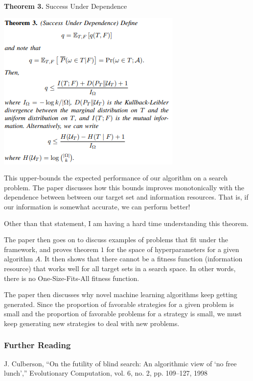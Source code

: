 \documentclass{article}
\begin{document}
\bigskip

\newpage
\textbf{Theorem 3.} Success Under Dependence
\begin{center}
    \includegraphics{SuccessUnderDependence.PNG}
\end{center}

This upper-bounds the expected performance of our algorithm on a search problem. The paper discusses how this bounds improves monotonically with the dependence between between our target set and information resources. That is, if our information is somewhat accurate, we can perform better! 

Other than that statement, I am having a hard time understanding this theorem. 


\bigskip

The paper then goes on to discuss examples of problems that fit under the framework, and proves theorem $1$ for the space of hyperparameters for a given algorithm $A$. It then shows that there cannot be a fitness function (information resource) that works well for all target sets in a search space. In other words, there is no One-Size-Fits-All fitness function. 

\bigskip

The paper then discusses why novel machine learning algorithms keep getting generated. Since the proportion of favorable strategies for a given problem is small and the proportion of favorable problems for a strategy is small, we must keep generating new strategies to deal with new problems.  

\subsubsection*{Further Reading} 

J. Culberson, “On the futility of blind search: An algorithmic view of
‘no free lunch’,” Evolutionary Computation, vol. 6, no. 2, pp. 109–127,
1998
\end{document}
